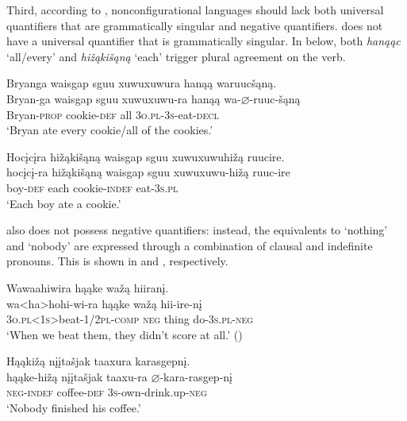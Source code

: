 \documentclass[output=paper]{LSP/langsci}
\begin{document}
Third, according to \citet{Baker1996}, nonconfigurational languages should lack both universal quantifiers that are grammatically singular and negative quantifiers.  does not have a universal quantifier that is grammatically singular.  In  below, both \textit{hanąąc} `all/every' and \textit{hi\v{z}ąki\v{s}ąną} `each' trigger plural agreement on the verb.

\begin{exe}
\ex\label{ex:jrs:19}	
\begin{xlist}	
\ex
\glll Bryanga {waisgap sguu xuwuxuwura} 	hanąą 	waruuc\v{s}ąną.\\
Bryan-ga 	{waisgap sguu xuwuxuwu-ra} 	hanąą 	wa-$\varnothing$-ruuc-\v{s}ąną \\
	Bryan-\textsc{prop} 	cookie-\textsc{def}	all 		\textsc{3o.pl-3s}-eat-\textsc{decl} \\
\trans `Bryan ate every cookie/all of the cookies.'

\ex 
\glll Hoc\k{i}c\k{i}ra 	hi\v{z}ąki\v{s}ąną 	{waisgap sguu xuwuxuwuhi\v{z}ą }		ruucire.\\
hoc\k{i}c\k{i}-ra 	hi\v{z}ąki\v{s}ąną 	{waisgap sguu xuwuxuwu-hi\v{z}ą }		ruuc-ire \\
	boy-\textsc{def} 		each 					cookie-\textsc{indef}		eat-\textsc{3s.pl}\\
\trans `Each boy ate a cookie.'
\end{xlist}
\end{exe}

 also does not possess negative quantifiers: instead, the equivalents to `nothing' and `nobody' are expressed through a combination of clausal  and indefinite pronouns. This is shown in and , respectively.

\ea\label{ex:jrs:20}
\ea\label{ex:jrs:20a)}
\glll Wawaahiwira 	hąąke 	wa\v{z}ą 	hiiran\k{i}. \\
wa<ha>hohi-wi-ra 						hąąke 	wa\v{z}ą 	hii-ire-n\k{i} \\
	\textsc{3o.pl<1s>}beat-\textsc{1/2pl}-\textsc{comp} \textsc{neg}		thing 	do-\textsc{3s.pl-neg} \\
\trans `When we beat them, they didn't score at all.' (\citealt{Hartmann2012}) 

\ex \label{ex:jrs:20b}
\glll Hąąki\v{z}ą 	{n\k{i}\k{i}ta\v{s}jak taaxura} 	karasgepn\k{i}. \\
hąąke-hi\v{z}ą  {n\k{i}\k{i}ta\v{s}jak taaxu-ra }	$\varnothing$-kara-rasgep-n\k{i} \\
	\textsc{neg-indef} 	coffee-\textsc{def}	\textsc{3s}-own-drink.up-\textsc{neg} \\
\trans `Nobody finished his coffee.'
\z 
\z 
	
\end{document}

